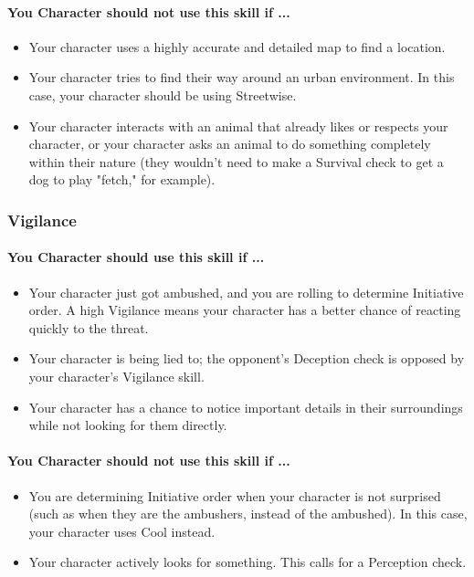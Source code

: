 \begin{multicols}{2}
\paragraph{You Character should not use this skill if ...}
\begin{itemize}
    \item Your character uses a highly accurate and detailed map to find a location.
    \item Your character tries to find their way around an urban environment. In
        this case, your character should be using Streetwise.
    \item Your character interacts with an animal that already likes or respects
        your character, or your character asks an animal to do something completely
        within their nature (they wouldn't need to make a Survival check to get a
        dog to play "fetch," for example).
\end{itemize}

\subsubsection{Vigilance}\label{skill:vigilance}
\paragraph{You Character should use this skill if ...}
\begin{itemize}
    \item Your character just got ambushed, and you are rolling to determine
        Initiative order. A high Vigilance means your character has a better chance
        of reacting quickly to the threat.
    \item Your character is being lied to; the opponent's Deception check is opposed
        by your character's Vigilance skill.
    \item Your character has a chance to notice important details in their
        surroundings while not looking for them directly.
\end{itemize}
\paragraph{You Character should not use this skill if ...}
\begin{itemize}
    \item You are determining Initiative order when your character is not surprised
        (such as when they are the ambushers, instead of the ambushed). In this
        case, your character uses Cool instead.
    \item Your character actively looks for something. This calls for a Perception
        check.
\end{itemize}

\end{multicols}
\hrulefill
